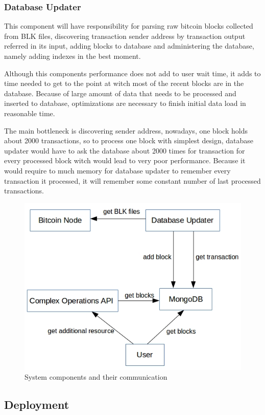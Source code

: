\documentclass[12pt, en, eng]{mgr}
\begin{document}
\subsubsection{Database Updater}
This component will have responsibility for parsing raw bitcoin blocks collected from BLK files, discovering transaction sender address by transaction output referred in its input, adding blocks to database and administering the database, namely adding indexes in the best moment.

Although this components performance does not add to user wait time, it adds to time needed to get to the point at witch most of the recent blocks are in the database. Because of large amount of data that needs to be processed and inserted to database, optimizations are necessary to finish initial data load in reasonable time.

The main bottleneck is discovering sender address, nowadays, one block holds about 2000 transactions, so to process one block with simplest design, database updater would have to ask the database about 2000 times for transaction for every processed block witch would lead to very poor performance. Because it would require to much memory for database updater to remember every transaction it processed, it will remember some constant number of last processed transactions.


\begin{figure}[H]
  \includegraphics[width=0.8\linewidth]{component-diagram.png}
  \caption{System components and their communication}
  \label{fig:system-components-and-their-communication}
\end{figure}



\subsection{Deployment}
\end{document}
